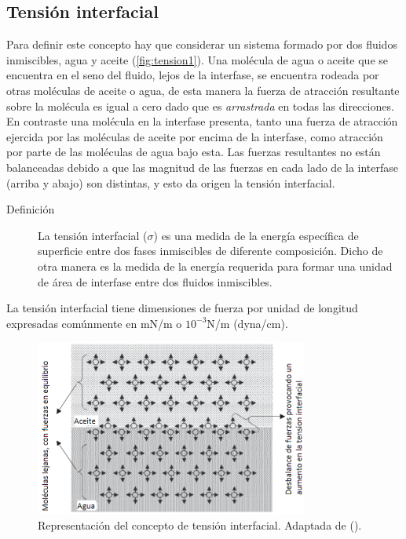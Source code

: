 \subsection{Tensión interfacial}

Para definir este concepto hay que considerar un sistema formado por dos fluidos inmiscibles, agua y aceite (\autoref{fig:tension1}). Una molécula de agua o aceite que se encuentra en el seno del fluido, lejos de la interfase, se encuentra rodeada por otras moléculas de aceite o agua, de esta manera la fuerza de atracción resultante sobre la molécula es igual a cero dado que es \emph{arrastrada} en todas las direcciones. En contraste una molécula en la interfase presenta, tanto una fuerza de atracción ejercida por las moléculas de aceite por encima de la interfase, como atracción por parte de las moléculas de agua bajo esta. Las fuerzas resultantes no están balanceadas debido a que las magnitud de las fuerzas en cada lado de la interfase (arriba y abajo) son distintas, y esto da origen la tensión interfacial.
\begin{description}
    \item[Definición] La tensión interfacial ($\sigma$) es una medida de la energía específica de superficie entre dos fases inmiscibles de diferente composición. Dicho de otra manera es la medida de la energía requerida para formar una unidad de área de interfase entre dos fluidos inmiscibles.
\end{description}
La tensión interfacial tiene dimensiones de fuerza por unidad de longitud expresadas comúnmente en mN/m o $10^{-3}$N/m (dyna/cm).
\begin{figure}
    \centering
    \includegraphics[width=0.8\textwidth]{Graphics/tension1.png}
    \caption[Tensión interfacial]{Representación del concepto de tensión interfacial. Adaptada de (\cite{Dandekar}).}
    \label{fig:tension1}
\end{figure}

